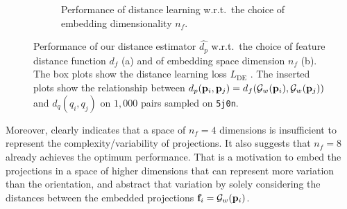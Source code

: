 \begin{figure}[ht]
\begin{subfigure}[t]{0.52\linewidth}
        \caption{%
            Performance of distance learning w.r.t.\ the choice of embedding dimensionality $n_f$.
        }\label{fig:4d-vs-256d-de}
    \end{subfigure}
        \caption{%
            Performance of our distance estimator $\widehat{d_p}$ w.r.t.\ the choice of feature distance function $d_f$ (a) and of embedding space dimension $n_f$ (b). 
            The box plots show the distance learning loss $L_\text{DE}$ .
            The inserted plots show the relationship between $d_p(\mathbf{p}_i, \mathbf{p}_j) = d_f(\mathcal{G}_w(\mathbf{p}_i), \mathcal{G}_w(\mathbf{p}_j))$ and $d_q(q_i, q_j)$ on $1,000$ pairs sampled on \texttt{5j0n}.
        }
\end{figure}

Moreover,  clearly indicates that a space of $n_f=4$ dimensions is insufficient to represent the complexity/variability of projections. It also suggests that $n_f=8$ already achieves the optimum performance.
That is a motivation to embed the projections in a space of higher dimensions that can represent more variation than the orientation, and abstract that variation by solely considering the distances between the embedded projections $\mathbf{f}_i = \mathcal{G}_w(\mathbf{p}_i)$.


